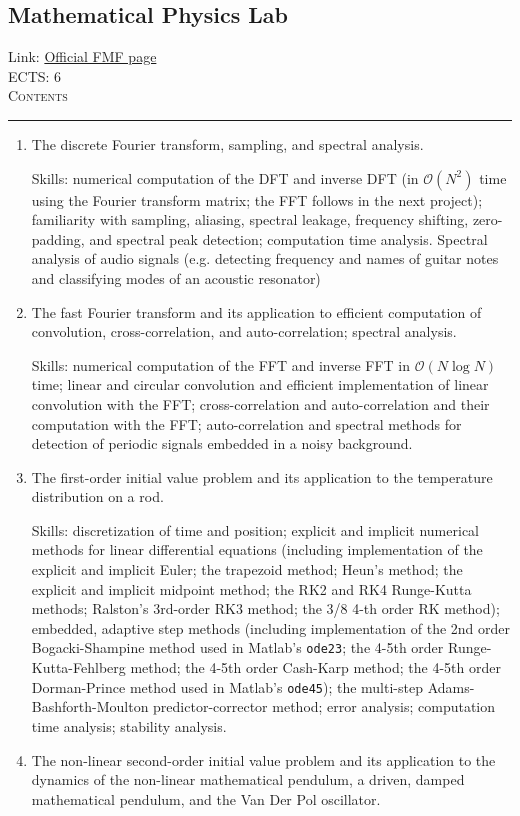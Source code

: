 \documentclass[11pt, a4paper]{article}
\newenvironment{course}[3]{
\subsection{#1}%
Link: \href{#2}{Official FMF page}\\%
ECTS: #3%
\vspace{1ex}
\\
{\large \textsc{Contents}}\\[-0.9ex]%
\rule{\textwidth}{0.5pt}
\vspace{-3ex}
}
{}
\newenvironment{chapter}[1]{
\begin{tcolorbox}[title=#1, breakable]
}
{\end{tcolorbox}}
\begin{document}
\begin{course}{Mathematical Physics Lab}{https://www.fmf.uni-lj.si/en/study-physics/programmes/1fiz/2020/7000777/courses/1159/}{6}
\begin{chapter}{Projects}
\begin{enumerate}
            \item The discrete Fourier transform, sampling, and spectral analysis.

            Skills: numerical computation of the DFT and inverse DFT (in $ \mathcal{O}(N^{2}) $ time using the Fourier transform matrix; the FFT follows in the next project); familiarity with sampling, aliasing, spectral leakage, frequency shifting, zero-padding, and spectral peak detection; computation time analysis.
            Spectral analysis of audio signals (e.g. detecting frequency and names of guitar notes and classifying modes of an acoustic resonator)
        
            \item The fast Fourier transform and its application to efficient computation of convolution, cross-correlation, and auto-correlation; spectral analysis.

            Skills: numerical computation of the FFT and inverse FFT in $ \mathcal{O}(N \log N) $ time; linear and circular convolution and efficient implementation of linear convolution with the FFT; cross-correlation and auto-correlation and their computation with the FFT; auto-correlation and spectral methods for detection of periodic signals embedded in a noisy background.

            \item The first-order initial value problem and its application to the temperature distribution on a rod.

            Skills: discretization of time and position; explicit and implicit numerical methods for linear differential equations (including implementation of the explicit and implicit Euler; the trapezoid method; Heun's method; the explicit and implicit midpoint method; the RK2 and RK4 Runge-Kutta methods; Ralston's 3rd-order RK3 method; the 3/8 4-th order RK method); embedded, adaptive step methods (including implementation of the 2nd order Bogacki-Shampine method used in Matlab's \texttt{ode23}; the 4-5th order Runge-Kutta-Fehlberg method; the 4-5th order Cash-Karp method; the 4-5th order Dorman-Prince method used in Matlab's \texttt{ode45}); the multi-step Adams-Bashforth-Moulton predictor-corrector method; error analysis; computation time analysis; stability analysis.

            \item The non-linear second-order initial value problem and its application to the dynamics of the non-linear mathematical pendulum, a driven, damped mathematical pendulum, and the Van Der Pol oscillator.


\end{enumerate}
\end{chapter}
\end{course}
\end{document}

